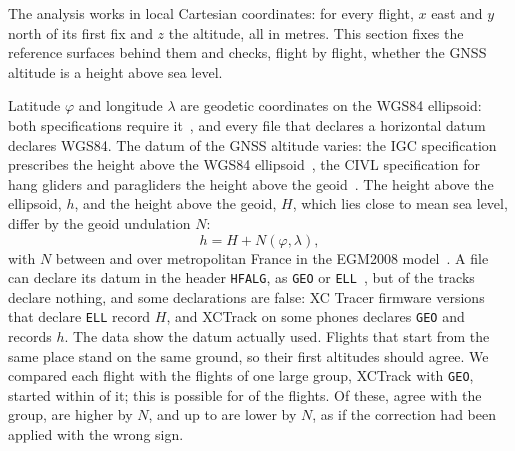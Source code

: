 The analysis works in local Cartesian coordinates: for every flight, $x$ east and $y$
north of its first fix and $z$ the altitude, all in metres. This section fixes the
reference surfaces behind them and checks, flight by flight, whether the GNSS altitude
is a height above sea level.

Latitude $\varphi$ and longitude $\lambda$ are geodetic coordinates on the WGS84
ellipsoid: both specifications require it~\cite{fai_igc_spec,fai_civl_s7h_2024}, and
every file that declares a horizontal datum declares WGS84. The datum of the GNSS
altitude varies: the IGC specification prescribes the height above the WGS84
ellipsoid~\cite{fai_igc_spec}, the CIVL specification for hang gliders and paragliders
the height above the geoid~\cite{fai_civl_s7h_2024}. The height above the ellipsoid, $h$, and
the height above the geoid, $H$, which lies close to mean sea level, differ by the geoid
undulation $N$:
\begin{equation}
  h = H + N(\varphi,\lambda),
  \label{eq:undulation}
\end{equation}
with $N$ between  and  over metropolitan
France in the EGM2008 model~\cite{pavlis2012egm2008}. A file can declare its datum in
the header \texttt{HFALG}, as \texttt{GEO} or \texttt{ELL}~\cite{fai_igc_spec}, but
 of the tracks declare nothing, and some declarations are
false: XC Tracer firmware versions that declare \texttt{ELL} record $H$, and XCTrack on
some phones declares \texttt{GEO} and records $h$. The data show the datum actually used.
Flights that start from the same place stand on the same ground, so their first
altitudes should agree. We compared each flight with the flights of one large group,
XCTrack with \texttt{GEO}, started within  of it; this is
possible for  of the flights. Of these,
 agree with the group, 
are higher by $N$, and up to  are lower by $N$, as if the
correction had been applied with the wrong sign.

